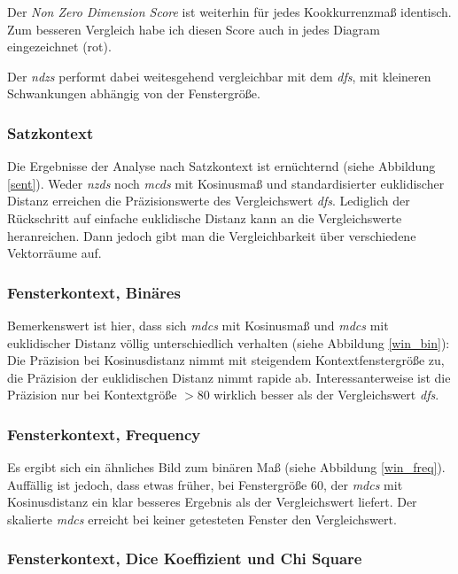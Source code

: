 \documentclass[11pt,numbers=noenddot]{scrartcl}
\begin{document}
Der \emph{Non Zero Dimension Score} ist weiterhin für jedes Kookkurrenzmaß identisch. Zum besseren Vergleich habe ich diesen Score auch in jedes Diagram eingezeichnet (rot).

Der \emph{ndzs} performt dabei weitesgehend vergleichbar mit dem \emph{dfs}, mit kleineren Schwankungen abhängig von der Fenstergröße.

\subsubsection {Satzkontext}

Die Ergebnisse der Analyse nach Satzkontext ist ernüchternd (siehe Abbildung \ref{sent}). Weder \emph{nzds} noch \emph{mcds} mit Kosinusmaß und standardisierter euklidischer Distanz erreichen die Präzisionswerte des Vergleichswert \emph{dfs}. Lediglich der Rückschritt auf einfache euklidische Distanz kann an die Vergleichswerte heranreichen. Dann jedoch gibt man die Vergleichbarkeit über verschiedene Vektorräume auf.


\subsubsection{Fensterkontext, Binäres}

Bemerkenswert ist hier, dass sich \emph{mdcs} mit Kosinusmaß und \emph{mdcs} mit euklidischer Distanz völlig unterschiedlich verhalten (siehe Abbildung \ref{win_bin}): Die Präzision bei Kosinusdistanz nimmt mit steigendem Kontextfenstergröße zu, die Präzision der euklidischen Distanz nimmt rapide ab. Interessanterweise ist die Präzision nur bei Kontextgröße $>80$ wirklich besser als der Vergleichswert \emph{dfs}.


\subsubsection{Fensterkontext, Frequency}

Es ergibt sich ein ähnliches Bild zum binären Maß (siehe Abbildung \ref{win_freq}). Auffällig ist jedoch, dass etwas früher, bei Fenstergröße 60, der \emph{mdcs} mit Kosinusdistanz ein klar besseres Ergebnis als der Vergleichswert liefert. Der skalierte \emph{mdcs} erreicht bei keiner getesteten Fenster den Vergleichswert.

\subsubsection{Fensterkontext, Dice Koeffizient und Chi Square}
\end{document}
